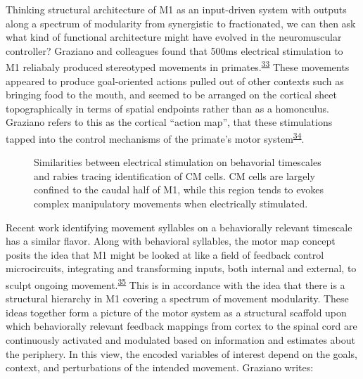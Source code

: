 \documentclass[
  a4paper,
]{article}
\begin{document}
Thinking structural architecture of M1 as an input-driven system with
outputs along a spectrum of modularity from synergistic to fractionated,
we can then ask what kind of functional architecture might have evolved
in the neuromuscular controller? Graziano and colleagues found that
500ms electrical stimulation to M1 reliabaly produced stereotyped
movements in
primates.\textsuperscript{\protect\hyperlink{ref-grazianoORGANIZATIONBEHAVIORALREPERTOIRE2006}{33}}
These movements appeared to produce goal-oriented actions pulled out of
other contexts such as bringing food to the mouth, and seemed to be
arranged on the cortical sheet topographically in terms of spatial
endpoints rather than as a homonculus. Graziano refers to this as the
cortical ``action map'', that these stimulations tapped into the control
mechanisms of the primate's motor
system\textsuperscript{\protect\hyperlink{ref-grazianoIntelligentMovementMachine2009}{34}}.

\begin{figure}[!h]
\centering
{}
\caption{Similarities between electrical stimulation on behavorial timescales and rabies tracing identification of CM cells. CM cells are largely confined to the caudal half of M1, while this region tends to evokes complex manipulatory movements when electrically stimulated.}
\label{fig:motor_maps}
\end{figure}

Recent work identifying movement syllables on a behaviorally relevant
timescale has a similar flavor. Along with behavioral syllables, the
motor map concept posits the idea that M1 might be looked at like a
field of feedback control microcircuits, integrating and transforming
inputs, both internal and external, to sculpt ongoing
movement.\textsuperscript{\protect\hyperlink{ref-wiltschkoMappingSubSecondStructure2015}{35}}
This is in accordance with the idea that there is a structural hierarchy
in M1 covering a spectrum of movement modularity. These ideas together
form a picture of the motor system as a structural scaffold upon which
behaviorally relevant feedback mappings from cortex to the spinal cord
are continuously activated and modulated based on information and
estimates about the periphery. In this view, the encoded variables of
interest depend on the goals, context, and perturbations of the intended
movement. Graziano writes:
\end{document}

